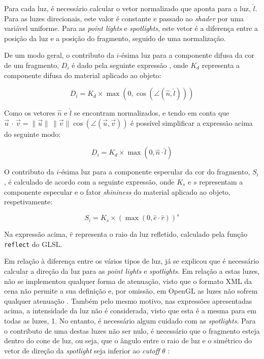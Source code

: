 \documentclass[12pt, a4paper]{article}
\begin{document}
Para cada luz, é necessário calcular o vetor normalizado que aponta para a luz, $\hat{l}$. Para as
luzes direcionais, este valor é constante e passado ao \emph{shader} por uma variável uniforme. Para
as \emph{point lights} e \emph{spotlights}, este vetor é a diferença entre a posição da luz e a
posição do fragmento, seguido de uma normalização.

De um modo geral, o contributo da $i$-ésima luz para a componente difusa da cor de um fragmento,
$D_i$ é dado pela seguinte expressão \cite{learn-opengl-1}, onde $K_d$ representa a componente
difusa do material aplicado ao objeto:

$$
D_i = K_d \times \max \left ( 0, \cos \left ( \angle (\hat{n}, \hat{l}) \right ) \right )
$$

Como os vetores $\hat{n}$ e $\hat{l}$ se encontram normalizados, e tendo em conta que
$
\vec{u} \, \cdot \, \vec{v} =
\lVert \vec{u} \rVert \, \lVert \vec{v} \rVert \cos (\angle (\vec{u}, \vec{v}))
$
é possível simplificar a expressão acima do seguinte modo:

$$
D_i = K_d \times \max \left ( 0, \hat{n} \cdot \hat{l} \right )
$$

O contributo da $i$-ésima luz para a componente especular da cor do fragmento, $S_i$, é calculado
de acordo com a seguinte expressão, onde $K_s$ e $s$ representam a componente especular e o fator
\emph{shininess} do material aplicado ao objeto, respetivamente:

$$
S_i = K_s \times \left ( \max \left (0, \hat{e} \cdot \hat{r} \right ) \right ) ^ s
$$

Na expressão acima, $\hat{r}$ representa o raio da luz refletido, calculado pela função
\texttt{reflect} do GLSL.

Em relação à diferença entre os vários tipos de luz, já se explicou que é necessário calcular a
direção da luz para as \emph{point lights} e \emph{spotlights}. Em relação a estas luzes, não se
implementou qualquer forma de atenuação, visto que o formato XML da cena não permite a sua definição
e, por omissão, em OpenGL as luzes não sofrem qualquer atenuação \cite{glLight}. Também pelo mesmo
motivo, nas expressões apresentadas acima, a intensidade da luz não é considerada, visto que esta é
a mesma para em todas as luzes, 1. No entanto, é necessário algum cuidado com as \emph{spotlights}.
Para o contributo de uma destas luzes não ser nulo, é necessário que o fragmento esteja dentro do
cone de luz, ou seja, que o ângulo entre o raio de luz e o simétrico do vetor de direção da
\emph{spotlight} seja inferior ao \emph{cutoff} $\theta$ \cite{learn-opengl-2}:
\end{document}
